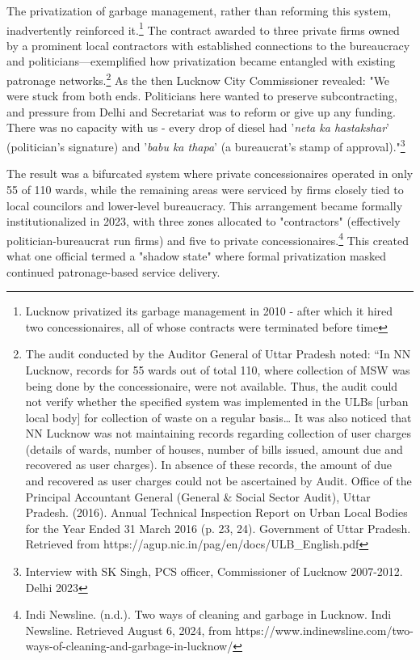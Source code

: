 The privatization of garbage management, rather than reforming this system, inadvertently reinforced it.\footnote{Lucknow privatized its garbage management in 2010 - after which it hired two concessionaires, all of whose contracts were terminated before time} The contract awarded to three private firms owned by a prominent local contractors with established connections to the bureaucracy and politicians—exemplified how privatization became entangled with existing patronage networks.\footnote{The audit conducted by the Auditor General of Uttar Pradesh noted:
“In NN Lucknow, records for 55 wards out of total 110, where collection of MSW was being done by the concessionaire, were not available. Thus, the audit could not verify whether the specified system was implemented in the ULBs [urban local body] for collection of waste on a regular basis… It was also noticed that NN Lucknow was not maintaining records regarding collection of user charges (details of wards, number of houses, number of bills issued, amount due and recovered as user charges). In absence of these records, the amount of due and recovered as user charges could not be ascertained by Audit. 
Office of the Principal Accountant General (General & Social Sector Audit), Uttar Pradesh. (2016). Annual Technical Inspection Report on Urban Local Bodies for the Year Ended 31 March 2016 (p. 23, 24). Government of Uttar Pradesh. Retrieved from https://agup.nic.in/pag/en/docs/ULB_English.pdf
} As the then Lucknow City Commissioner revealed: "We were stuck from both ends. Politicians here wanted to preserve subcontracting, and pressure from Delhi and Secretariat was to reform or give up any funding. There was no capacity with us - every drop of diesel had '\textit{neta ka hastakshar}' (politician's signature) and '\textit{babu ka thapa}' (a bureaucrat's stamp of approval)."\footnote{Interview with SK Singh, PCS officer, Commissioner of Lucknow 2007-2012. Delhi 2023
}

The result was a bifurcated system where private concessionaires operated in only 55 of 110 wards, while the remaining areas were serviced by firms closely tied to local councilors and lower-level bureaucracy. This arrangement became formally institutionalized in 2023, with three zones allocated to "contractors" (effectively politician-bureaucrat run firms) and five to private concessionaires.\footnote{Indi Newsline. (n.d.). Two ways of cleaning and garbage in Lucknow. Indi Newsline. Retrieved August 6, 2024, from https://www.indinewsline.com/two-ways-of-cleaning-and-garbage-in-lucknow/
} This created what one official termed a "shadow state" where formal privatization masked continued patronage-based service delivery.

